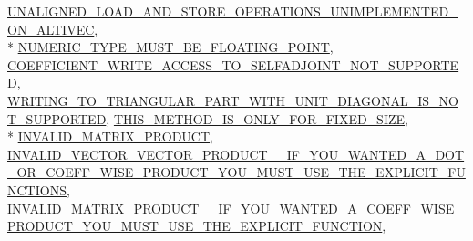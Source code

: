\begin{DoxyCompactItemize}
\hyperlink{structei__static__assert_3_01true_01_4_ada5f400d6b61aa0566ded13d516502e1a435ce1830ba56175c2e241decfa4e8f8}{U\-N\-A\-L\-I\-G\-N\-E\-D\-\_\-\-L\-O\-A\-D\-\_\-\-A\-N\-D\-\_\-\-S\-T\-O\-R\-E\-\_\-\-O\-P\-E\-R\-A\-T\-I\-O\-N\-S\-\_\-\-U\-N\-I\-M\-P\-L\-E\-M\-E\-N\-T\-E\-D\-\_\-\-O\-N\-\_\-\-A\-L\-T\-I\-V\-E\-C}, 
\\*
\hyperlink{structei__static__assert_3_01true_01_4_ada5f400d6b61aa0566ded13d516502e1a8c7a3eea74d68c835fd5dd8dc6019982}{N\-U\-M\-E\-R\-I\-C\-\_\-\-T\-Y\-P\-E\-\_\-\-M\-U\-S\-T\-\_\-\-B\-E\-\_\-\-F\-L\-O\-A\-T\-I\-N\-G\-\_\-\-P\-O\-I\-N\-T}, 
\hyperlink{structei__static__assert_3_01true_01_4_ada5f400d6b61aa0566ded13d516502e1aeffab0a4dd9ed910485ee26b9e2b8da0}{C\-O\-E\-F\-F\-I\-C\-I\-E\-N\-T\-\_\-\-W\-R\-I\-T\-E\-\_\-\-A\-C\-C\-E\-S\-S\-\_\-\-T\-O\-\_\-\-S\-E\-L\-F\-A\-D\-J\-O\-I\-N\-T\-\_\-\-N\-O\-T\-\_\-\-S\-U\-P\-P\-O\-R\-T\-E\-D}, 
\hyperlink{structei__static__assert_3_01true_01_4_ada5f400d6b61aa0566ded13d516502e1ad5682da3f11bbd628e03446c60e6bcc2}{W\-R\-I\-T\-I\-N\-G\-\_\-\-T\-O\-\_\-\-T\-R\-I\-A\-N\-G\-U\-L\-A\-R\-\_\-\-P\-A\-R\-T\-\_\-\-W\-I\-T\-H\-\_\-\-U\-N\-I\-T\-\_\-\-D\-I\-A\-G\-O\-N\-A\-L\-\_\-\-I\-S\-\_\-\-N\-O\-T\-\_\-\-S\-U\-P\-P\-O\-R\-T\-E\-D}, 
\hyperlink{structei__static__assert_3_01true_01_4_ada5f400d6b61aa0566ded13d516502e1a75fa0681ea12671ce5f0df88eceb5c6a}{T\-H\-I\-S\-\_\-\-M\-E\-T\-H\-O\-D\-\_\-\-I\-S\-\_\-\-O\-N\-L\-Y\-\_\-\-F\-O\-R\-\_\-\-F\-I\-X\-E\-D\-\_\-\-S\-I\-Z\-E}, 
\\*
\hyperlink{structei__static__assert_3_01true_01_4_ada5f400d6b61aa0566ded13d516502e1a991c135ded587c5265ca5af07796b4b6}{I\-N\-V\-A\-L\-I\-D\-\_\-\-M\-A\-T\-R\-I\-X\-\_\-\-P\-R\-O\-D\-U\-C\-T}, 
\hyperlink{structei__static__assert_3_01true_01_4_ada5f400d6b61aa0566ded13d516502e1ad96e3e7a5e617da26bb11824c42e717b}{I\-N\-V\-A\-L\-I\-D\-\_\-\-V\-E\-C\-T\-O\-R\-\_\-\-V\-E\-C\-T\-O\-R\-\_\-\-P\-R\-O\-D\-U\-C\-T\-\_\-\-\_\-\-I\-F\-\_\-\-Y\-O\-U\-\_\-\-W\-A\-N\-T\-E\-D\-\_\-\-A\-\_\-\-D\-O\-T\-\_\-\-O\-R\-\_\-\-C\-O\-E\-F\-F\-\_\-\-W\-I\-S\-E\-\_\-\-P\-R\-O\-D\-U\-C\-T\-\_\-\-Y\-O\-U\-\_\-\-M\-U\-S\-T\-\_\-\-U\-S\-E\-\_\-\-T\-H\-E\-\_\-\-E\-X\-P\-L\-I\-C\-I\-T\-\_\-\-F\-U\-N\-C\-T\-I\-O\-N\-S}, 
\hyperlink{structei__static__assert_3_01true_01_4_ada5f400d6b61aa0566ded13d516502e1a515efba0292f75051ab8ff55586f3267}{I\-N\-V\-A\-L\-I\-D\-\_\-\-M\-A\-T\-R\-I\-X\-\_\-\-P\-R\-O\-D\-U\-C\-T\-\_\-\-\_\-\-I\-F\-\_\-\-Y\-O\-U\-\_\-\-W\-A\-N\-T\-E\-D\-\_\-\-A\-\_\-\-C\-O\-E\-F\-F\-\_\-\-W\-I\-S\-E\-\_\-\-P\-R\-O\-D\-U\-C\-T\-\_\-\-Y\-O\-U\-\_\-\-M\-U\-S\-T\-\_\-\-U\-S\-E\-\_\-\-T\-H\-E\-\_\-\-E\-X\-P\-L\-I\-C\-I\-T\-\_\-\-F\-U\-N\-C\-T\-I\-O\-N}, 

\end{DoxyCompactItemize}
